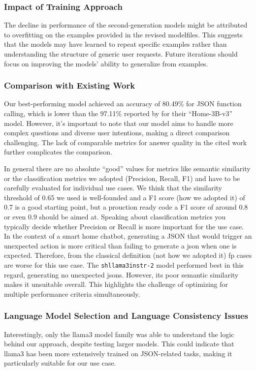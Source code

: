 \subsubsection{Impact of Training Approach}
The decline in performance of the second-generation models might be attributed to overfitting on the examples provided in the revised modelfiles. This suggests that the models may have learned to repeat specific examples rather than understanding the structure of generic user requests. Future iterations should focus on improving the models' ability to generalize from examples.
\subsubsection{Comparison with Existing Work}
Our best-performing model achieved an accuracy of 80.49\% for JSON function calling, which is lower than the 97.11\% reported by \citet{acon96_home_llm} for their ``Home-3B-v3'' model. However, it's important to note that our model aims to handle more complex questions and diverse user intentions, making a direct comparison challenging. The lack of comparable metrics for answer quality in the cited work further complicates the comparison.

In general there are no absolute ``good'' values for metrics like semantic similarity \cite{muhammad2022_similarity} or the classification metrics \cite{yacouby-axman-2020-probabilistic,dasExplainableActivityRecognition2023} we adopted (Precision, Recall, F1) and have to be carefully evaluated for individual use cases.
We think that the similarity threshold of 0.65 we used is well-founded and a F1 score (how we adopted it) of 0.7 is a good starting point, but a prouction ready code a F1 score of around 0.8 or even 0.9 should be aimed at.
Speaking about classification metrics you typically decide whether Precision or Recall is more important for the use case. In the context of a smart home chatbot, generating a JSON that would trigger an unexpected action is more critical than failing to generate a \gls{json} when one is expected. Therefore, from the classical definition (not how we adopted it) \gls{fp} cases are worse for this use case.
The \texttt{shllama3instr-2} model performed best in this regard, generating no unexpected \glspl{json}. 
However, its poor semantic similarity makes it unsuitable overall. This highlights the challenge of optimizing for multiple performance criteria simultaneously.

\subsubsection{Language Model Selection and Language Consistency Issues}
Interestingly, only the llama3 model family was able to understand the logic behind our approach, despite testing larger models. This could indicate that llama3 has been more extensively trained on JSON-related tasks, making it particularly suitable for our use case.

